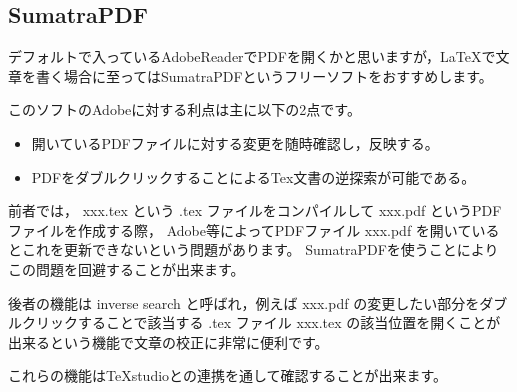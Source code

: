 \documentclass[10pt,a4paper,oneside,twocolumn,fleqn,dvipdfmx]{jsarticle}
\begin{document}
\subsection{SumatraPDF}
デフォルトで入っているAdobeReaderでPDFを開くかと思いますが，LaTeXで文章を書く場合に至ってはSumatraPDFというフリーソフトをおすすめします。

このソフトのAdobeに対する利点は主に以下の2点です。
\begin{itemize}
	\item 開いているPDFファイルに対する変更を随時確認し，反映する。
	\item PDFをダブルクリックすることによるTex文書の逆探索が可能である。
\end{itemize}
前者では， xxx.tex という .tex ファイルをコンパイルして xxx.pdf というPDFファイルを作成する際，
Adobe等によってPDFファイル xxx.pdf を開いているとこれを更新できないという問題があります。
SumatraPDFを使うことによりこの問題を回避することが出来ます。

後者の機能は inverse search と呼ばれ，例えば xxx.pdf の変更したい部分をダブルクリックすることで該当する .tex ファイル xxx.tex の該当位置を開くことが出来るという機能で文章の校正に非常に便利です。

これらの機能はTeXstudioとの連携を通して確認することが出来ます。
\end{document}

